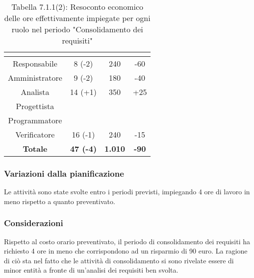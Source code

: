 \renewcommand{\arraystretch}{1.4}
\begin{table}[H]
\begin{center}
\begin{tabular}{|c|c|c|c|}
\hline
\rowcolor{title_row}
\textbf{\color{title_text}{Ruolo}}  & \textbf{\color{title_text}{Ore}} & \textbf{\color{title_text}{Costo in \euro}} & \textbf{\color{title_text}{Differenza al preventivo in \euro}} \\ \hline
Responsabile    & 8 (-2) & 240 & -60 \\ \hline
Amministratore  & 9 (-2) & 180 & -40 \\ \hline
Analista        & 14 (+1) & 350 & +25 \\ \hline
Progettista     & & &  \\ \hline
Programmatore   & & &  \\ \hline
Verificatore    & 16 (-1) & 240 & -15  \\ \hline
\textbf{Totale} & \textbf{47 (-4)}    & \textbf{1.010} & \textbf{-90} \\ \hline
\end{tabular}
\caption{Tabella 7.1.1(2): Resoconto economico delle ore effettivamente impiegate per ogni ruolo nel periodo "Consolidamento dei requisiti"\label{}}
\end{center}
\end{table}
\renewcommand{\arraystretch}{1}


\subsubsection{Variazioni dalla pianificazione}
Le attività sono state svolte entro i periodi previsti, impiegando 4 ore di lavoro in meno rispetto a quanto preventivato.

\subsubsection{Considerazioni}
Rispetto al costo orario preventivato, il periodo di consolidamento dei requisiti ha richiesto 4
ore in meno che corrispondono ad un risparmio di 90 euro. La ragione di ciò sta nel fatto che le attività di consolidamento si sono rivelate essere
di minor entità a fronte di un'analisi dei requisiti ben svolta.
\pagebreak
